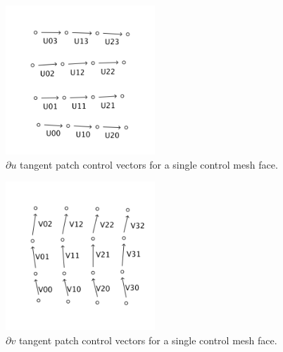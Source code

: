 \documentclass[12pt, letterpaper]{article}
\begin{document}
		\begin{figure}[h]
		\centering
		\includegraphics[width=0.5\textwidth]{duPatch}
		\caption{$\partial u$ tangent patch control vectors for a single control mesh face.}
		\label{fig:dU}
		\end{figure}
		
		\begin{figure}[h]
		\centering
		\includegraphics[width=0.5\textwidth]{dvPatch}
		\caption{$\partial v$ tangent patch control vectors for a single control mesh face.}
		\label{fig:dV}
		\end{figure}
\end{document}
